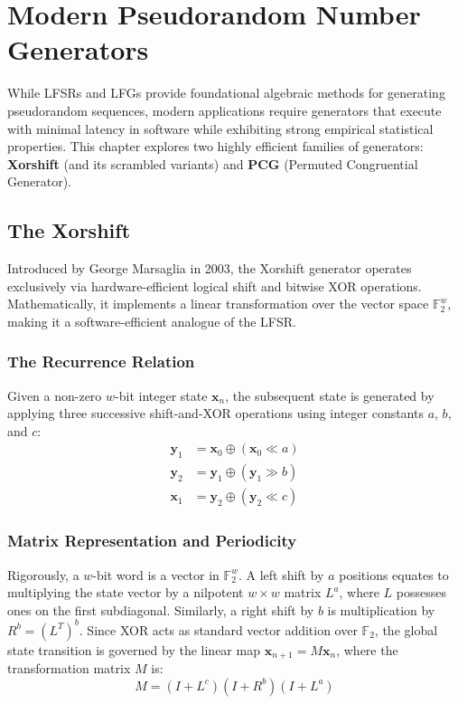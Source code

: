 \section{Modern Pseudorandom Number Generators}

While LFSRs and LFGs provide foundational algebraic methods for generating pseudorandom sequences, modern applications require generators that execute with minimal latency in software while exhibiting strong empirical statistical properties. This chapter explores two highly efficient families of generators: \textbf{Xorshift} (and its scrambled variants) and \textbf{PCG} (Permuted Congruential Generator).

\subsection{The Xorshift}

Introduced by George Marsaglia in 2003, the Xorshift generator operates exclusively via hardware-efficient logical shift and bitwise XOR operations. Mathematically, it implements a linear transformation over the vector space $\mathbb{F}_2^w$, making it a software-efficient analogue of the LFSR.

\subsubsection{The Recurrence Relation}


Given a non-zero $w$-bit integer state $\mathbf{x}_n$, the subsequent state is generated by applying three successive shift-and-XOR operations using integer constants $a$, $b$, and $c$:
\begin{align*}
    \mathbf{y}_1 &= \mathbf{x}_0 \oplus (\mathbf{x}_0 \ll a) \\
    \mathbf{y}_2 &= \mathbf{y}_1 \oplus (\mathbf{y}_1 \gg b) \\
    \mathbf{x}_1 &= \mathbf{y}_2 \oplus (\mathbf{y}_2 \ll c)
\end{align*}


\subsubsection{Matrix Representation and Periodicity}
Rigorously, a $w$-bit word is a vector in $\mathbb{F}_2^w$. A left shift by $a$ positions equates to multiplying the state vector by a nilpotent $w \times w$ matrix $L^a$, where $L$ possesses ones on the first subdiagonal. Similarly, a right shift by $b$ is multiplication by $R^b = (L^T)^b$. Since XOR acts as standard vector addition over $\mathbb{F}_2$, the global state transition is governed by the linear map $\mathbf{x}_{n+1} = M\mathbf{x}_n$, where the transformation matrix $M$ is:
$$
M = (I + L^c)(I + R^b)(I + L^a)
$$

